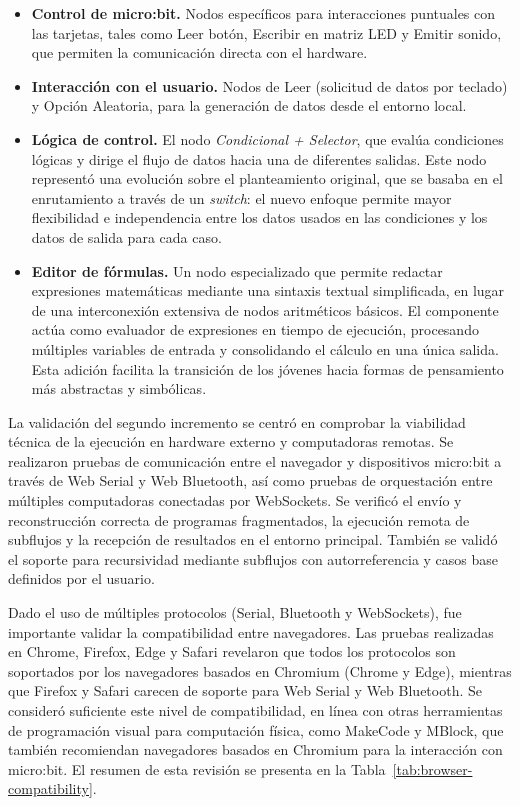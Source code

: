 \begin{itemize}
    \item \textbf{Control de micro:bit.} Nodos específicos para interacciones puntuales con las tarjetas, tales como Leer botón, Escribir en matriz LED y Emitir sonido, que permiten la comunicación directa con el hardware.
    \item \textbf{Interacción con el usuario.} Nodos de Leer (solicitud de datos por teclado) y Opción Aleatoria, para la generación de datos desde el entorno local.
    \item \textbf{Lógica de control.} El nodo \emph{Condicional + Selector}, que evalúa condiciones lógicas y dirige el flujo de datos hacia una de diferentes salidas. Este nodo representó una evolución sobre el planteamiento original, que se basaba en el enrutamiento a través de un \emph{switch}: el nuevo enfoque permite mayor flexibilidad e independencia entre los datos usados en las condiciones y los datos de salida para cada caso.
    \item \textbf{Editor de fórmulas.} Un nodo especializado que permite redactar expresiones matemáticas mediante una sintaxis textual simplificada, en lugar de una interconexión extensiva de nodos aritméticos básicos. El componente actúa como evaluador de expresiones en tiempo de ejecución, procesando múltiples variables de entrada y consolidando el cálculo en una única salida. Esta adición facilita la transición de los jóvenes hacia formas de pensamiento más abstractas y simbólicas.
\end{itemize}

La validación del segundo incremento se centró en comprobar la viabilidad técnica de la ejecución en hardware externo y computadoras remotas. Se realizaron pruebas de comunicación entre el navegador y dispositivos micro:bit a través de Web Serial y Web Bluetooth, así como pruebas de orquestación entre múltiples computadoras conectadas por WebSockets. Se verificó el envío y reconstrucción correcta de programas fragmentados, la ejecución remota de subflujos y la recepción de resultados en el entorno principal. También se validó el soporte para recursividad mediante subflujos con autorreferencia y casos base definidos por el usuario.

Dado el uso de múltiples protocolos (Serial, Bluetooth y WebSockets), fue importante validar la compatibilidad entre navegadores. Las pruebas realizadas en Chrome, Firefox, Edge y Safari revelaron que todos los protocolos son soportados por los navegadores basados en Chromium (Chrome y Edge), mientras que Firefox y Safari carecen de soporte para Web Serial y Web Bluetooth. Se consideró suficiente este nivel de compatibilidad, en línea con otras herramientas de programación visual para computación física, como MakeCode y MBlock, que también recomiendan navegadores basados en Chromium para la interacción con micro:bit. El resumen de esta revisión se presenta en la Tabla~\ref{tab:browser-compatibility}.

